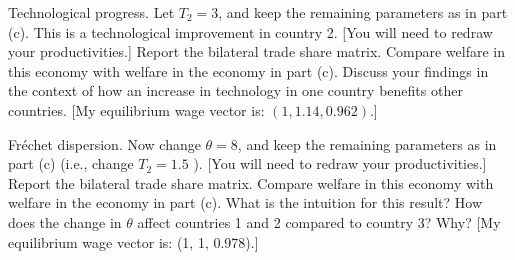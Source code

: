 \documentclass[11pt, assign]{assign}
\begin{document}
\begin{problem}[title=Simple Version of Ricardian Trade Model,source={Eaton and Kortum, 2002}]
\begin{subproblems}
\question Technological progress. Let $T_{2}=3$, and keep the remaining parameters as in part (c). This is a technological improvement in country 2. [You will need to redraw your productivities.] Report the bilateral trade share matrix. Compare welfare in this economy with welfare in the economy in part (c). Discuss your findings in the context of how an increase in technology in one country benefits other countries. [My equilibrium wage vector is: $(1,1.14,0.962)$.]

\question Fr\'echet dispersion. Now change $\theta=8$, and keep the remaining parameters as in part (c) (i.e., change $T_{2}=1.5$ ). [You will need to redraw your productivities.] Report the bilateral trade share matrix. Compare welfare in this economy with welfare in the economy in part (c). What is the intuition for this result? How does the change in $\theta$ affect countries 1 and 2 compared to country 3? Why? [My equilibrium wage vector is: (1, 1, 0.978).]

\end{subproblems}

\end{problem}
\end{document}
